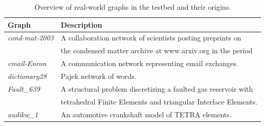 \begin{table}[t]
\small
\centering
\caption{Overview of real-world graphs in the testbed and their origins.}
\label{tab:real-graphs}
\begin{tabular}{ll}
{\bf Graph} & {\bf Description} \\ \hline \hline
{\it cond-mat-2003} \cite{Newman06042004} & A collaboration network of scientists posting preprints 
on \\ & the condensed matter archive at www.arxiv.org in the period \\ \hline %
{\it email-Enron} \cite{Leskovec:2005:GOT:1081870.1081893} & A communication network representing
email exchanges. \\
\hline %
{\it dictionary28} \cite{pajek2006} & Pajek network of words. \\ \hline
{\it Fault\_639} \cite{Ferronato20083922} & A structural problem discretizing a faulted gas reservoir with \\
& tetrahedral Finite Elements and triangular Interface Elements. \\ \hline
{\it audikw\_1} \cite{Davis97theuniversity} & An automotive crankshaft model of TETRA elements. \\ \hline

\end{tabular}
\end{table}
